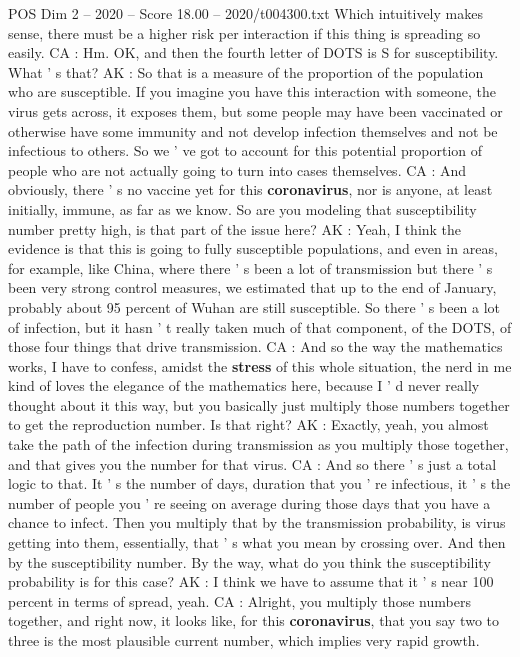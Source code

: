 \begin{textsample}{POS Dim 2 – 2020 – Score 18.00 – 2020/t004300.txt}
Which intuitively makes sense, there must be a higher risk per interaction if this thing is spreading so easily.
CA : Hm.
OK, and then the fourth letter of DOTS is S for susceptibility.
What ' s that?
AK : So that is a measure of the proportion of the population who are susceptible.
If you imagine you have this interaction with someone, the virus gets across, it exposes them, but some people may have been vaccinated or otherwise have some immunity and not develop infection themselves and not be infectious to others.
So we ' ve got to account for this potential proportion of people who are not actually going to turn into cases themselves.
CA : And obviously, there ' s no vaccine yet for this \textbf{coronavirus}, nor is anyone, at least initially, immune, as far as we know.
So are you modeling that susceptibility number pretty high, is that part of the issue here?
AK : Yeah, I think the evidence is that this is going to fully susceptible populations, and even in areas, for example, like China, where there ' s been a lot of transmission but there ' s been very strong control measures, we estimated that up to the end of January, probably about 95 percent of Wuhan are still susceptible.
So there ' s been a lot of infection, but it hasn ' t really taken much of that component, of the DOTS, of those four things that drive transmission.
CA : And so the way the mathematics works, I have to confess, amidst the \textbf{stress} of this whole situation, the nerd in me kind of loves the elegance of the mathematics here, because I ' d never really thought about it this way, but you basically just multiply those numbers together to get the reproduction number.
Is that right?
AK : Exactly, yeah, you almost take the path of the infection during transmission as you multiply those together, and that gives you the number for that virus.
CA : And so there ' s just a total logic to that.
It ' s the number of days, duration that you ' re infectious, it ' s the number of people you ' re seeing on average during those days that you have a chance to infect.
Then you multiply that by the transmission probability, is virus getting into them, essentially, that ' s what you mean by crossing over.
And then by the susceptibility number.
By the way, what do you think the susceptibility probability is for this case?
AK : I think we have to assume that it ' s near 100 percent in terms of spread, yeah.
CA : Alright, you multiply those numbers together, and right now, it looks like, for this \textbf{coronavirus}, that you say two to three is the most plausible current number, which implies very rapid growth.

\end{textsample}
